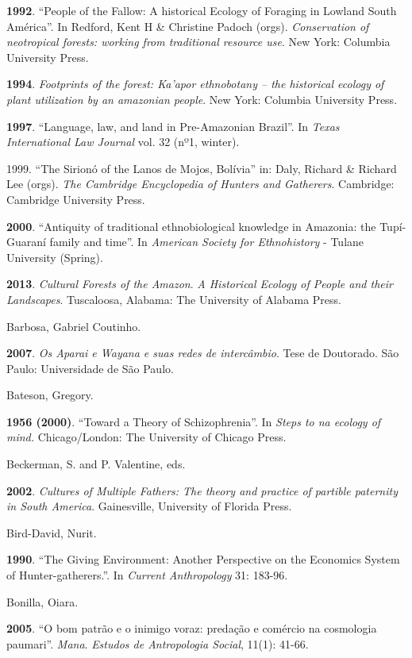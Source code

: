 \textbf{1992}. ``People of the Fallow: A historical Ecology of Foraging
in Lowland South América''. In Redford, Kent H \& Christine Padoch
(orgs). \emph{Conservation of neotropical forests: working from
traditional resource use}. New York: Columbia University Press.

\textbf{1994}. \emph{Footprints of the forest: Ka'apor ethnobotany --
the historical ecology of plant utilization by an amazonian people}. New
York: Columbia University Press.

\textbf{1997}. ``Language, law, and land in Pre-Amazonian Brazil''. In
\emph{Texas International Law Journal} vol. 32 (nº1, winter).

1999. ``The Sirionó of the Lanos de Mojos, Bolívia'' in: Daly, Richard
\& Richard Lee (orgs). \emph{The Cambridge Encyclopedia of Hunters and
Gatherers}. Cambridge: Cambridge University Press.

\textbf{2000}. ``Antiquity of traditional ethnobiological knowledge in
Amazonia: the Tupí-Guaraní family and time''. In \emph{American Society
for Ethnohistory} - Tulane University (Spring).

\textbf{2013}. \emph{Cultural Forests of the Amazon}. \emph{A Historical
Ecology of People and their Landscapes}. Tuscaloosa, Alabama: The
University of Alabama Press. 

Barbosa, Gabriel Coutinho.

\textbf{2007}. \emph{Os Aparai e Wayana e suas redes de intercâmbio}.
Tese de Doutorado. São Paulo: Universidade de São Paulo.

Bateson, Gregory.

\textbf{1956 (2000)}. ``Toward a Theory of Schizophrenia''. In
\emph{Steps to na ecology of mind.} Chicago/London: The University of
Chicago Press.

Beckerman, S. and P. Valentine, eds.

\textbf{2002}. \emph{Cultures of Multiple Fathers: The theory and
practice of partible paternity in South America}. Gainesville,
University of Florida Press.

Bird-David, Nurit.

\textbf{1990}. ``The Giving Environment: Another Perspective on the
Economics System of Hunter-gatherers.''. In \emph{Current Anthropology}
31: 183-96.

Bonilla, Oiara.

\textbf{2005}. ``O bom patrão e o inimigo voraz: predação e comércio na
cosmologia paumari''. \emph{Mana}. \emph{Estudos de Antropologia
Social}, 11(1): 41-66.

